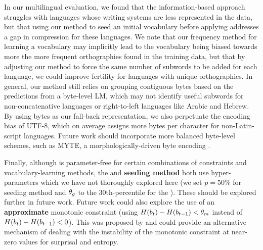In our multilingual evaluation, we found that the information-based approach struggles with languages whose writing systems are less represented in the data, but that using our method to seed an initial vocabulary before applying \bpe addresses a gap in compression for these languages. We note that our frequency method for learning a vocabulary may implicitly lead to the vocabulary being biased towards more the more frequent orthographies found in the training data, but that by adjusting our method to force the same number of subwords to be added for each language, we could improve fertility for languages with unique orthographies. In general, our method still relies on grouping contiguous bytes based on the predictions from a byte-level LM, which may not identify useful subwords for non-concatenative languages or right-to-left languages like Arabic and Hebrew. By using bytes as our fall-back representation, we also perpetuate the encoding bias of UTF-8, which on average assigns more bytes per character for non-Latin-script languages. Future work should incorporate more balanced byte-level schemes, such as MYTE, a morphologically-driven byte encoding \citep{limisiewicz-etal-2024-myte}.

Finally, although \tokname is parameter-free for certain combinations of constraints and vocabulary-learning methods, the  and \textbf{seeding method} both use hyper-parameters which we have not thoroughly explored here (we set $p=50\%$ for seeding method and $\theta_g$ to the 30th-percentile for the ). These should be explored further in future work. Future work could also explore the use of an \textbf{approximate} monotonic constraint (using $H(b_t) - H(b_{t-1}) < \theta_m$ instead of $H(b_t) - H(b_{t-1}) < 0$). This was proposed by \citet{pagnoni2024byte} and could provide an alternative mechanism of dealing with the instability of the monotonic constraint at near-zero values for surprisal and entropy.


